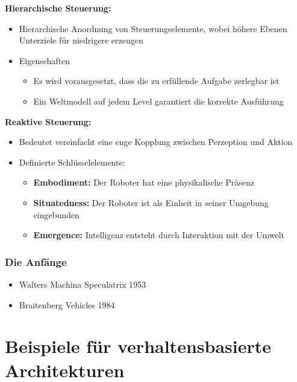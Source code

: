 \textbf{Hierarchische Steuerung:}
\begin{itemize}
	\item Hierarchische Anordnung von Steuerungselemente, wobei höhere Ebenen Unterziele für niedrigere erzeugen
	\item Eigenschaften
	\begin{itemize}
		\item Es wird vorausgesetzt, dass die zu erfüllende Aufgabe zerlegbar ist
		\item Ein Weltmodell auf jedem Level garantiert die korrekte Ausführung
	\end{itemize}
\end{itemize}

\textbf{Reaktive Steuerung:}
\begin{itemize}
	\item Bedeutet vereinfacht eine enge Kopplung zwischen Perzeption und Aktion
	\item Definierte Schlüsselelemente:
	\begin{itemize}
		\item \textbf{Embodiment:} Der Roboter hat eine physikalische Präsenz
		\item \textbf{Situatedness:} Der Roboter ist als Einheit in seiner Umgebung eingebunden
		\item \textbf{Emergence:} Intelligenz entsteht durch Interaktion mit der Umwelt
	\end{itemize}
\end{itemize}

\subsubsection{Die Anfänge}
\begin{itemize}
	\item Walters Machina Speculatrix 1953
	\item Braitenberg Vehicles 1984
\end{itemize}

\section{Beispiele für verhaltensbasierte Architekturen}

